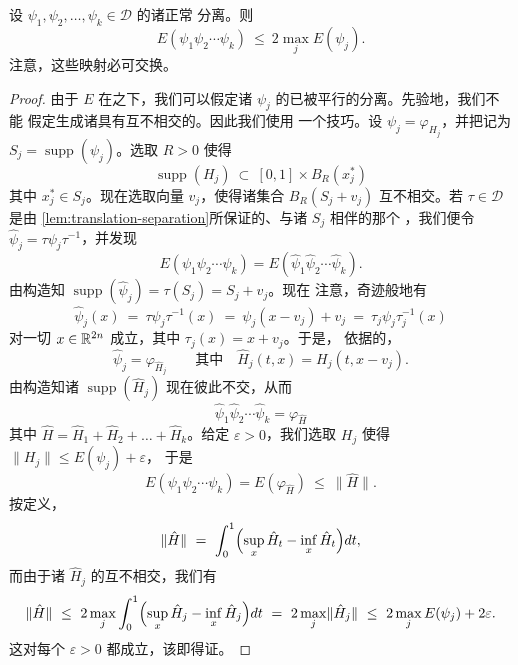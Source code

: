 \begin{lemma}\label{lem:energy-separated-product}
设 $\psi_{1},\psi_{2},\dots,\psi_{k}\in\mathcal{D}$ 的诸\trSupport{}正常%
分离。则
\[
E(\psi_{1}\psi_{2}\cdots\psi_{k})\ \leq\ 2\max_{j}E(\psi_{j}).
\]
注意，这些映射必可交换。
\end{lemma}

\begin{proof}
由于\trEnergy{} $E$ 在\trConjugate{}之下\trInvariant，我们可以假定诸%
$\psi_{j}$ 的\trSupport{}已被平行的\trHyperplane{}分离。先验地，我们不能%
假定生成诸\trHamiltonianFunction{}具有互不相交的\trSupport。因此我们使用%
一个技巧。设 $\psi_{j}=\varphi_{H_{j}}$，并把\trSupport{}记为%
$S_{j}=\operatorname{supp}(\psi_{j})$。选取 $R>0$ 使得
\[
\operatorname{supp}(H_{j})\ \subset\ [0,1]\times B_{R}(x_{j}^{*})
\]
其中 $x_{j}^{*}\in S_{j}$。现在选取向量 $v_{j}$，使得诸集合%
$B_{R}(S_{j}+v_{j})$ 互不相交。若 $\tau\in\mathcal{D}$ 是由%
\cref{lem:translation-separation}所保证的、与诸 $S_{j}$ 相伴的那个%
\trMapping，我们便令 $\hat{\psi}_{j}=\tau\psi_{j}\tau^{-1}$，并发现
\[
E(\psi_{1}\psi_{2}\cdots\psi_{k})=E(\hat{\psi}_{1}\hat{\psi}_{2}\cdots\hat{\psi}_{k}).
\]
由构造知 $\operatorname{supp}(\hat{\psi}_{j})=\tau(S_{j})=S_{j}+v_{j}$。现在%
注意，奇迹般地有
\[
\hat{\psi}_{j}(x)\ =\ \tau\psi_{j}\tau^{-1}(x)\ =\ \psi_{j}(x-v_{j})+v_{j}%
\ =\ \tau_{j}\psi_{j}\tau_{j}^{-1}(x)
\]
对一切 $x\in\mathbb{R}^{2n}$ 成立，其中\trTranslation{} $\tau_{j}(x)=x+v_{j}$。于是，%
依据\trHamiltonianVectorField{}的\trTransformationLaw，
\[
\hat{\psi}_{j}=\varphi_{\hat{H}_{j}}\qquad\text{其中}\quad \hat{H}_{j}(t,x)=H_{j}(t,x-v_{j}).
\]
由构造知诸 $\operatorname{supp}(\hat{H}_{j})$ 现在彼此不交，从而
\[
\hat{\psi}_{1}\hat{\psi}_{2}\cdots\hat{\psi}_{k}=\varphi_{\hat{H}}
\]
其中 $\hat{H}=\hat{H}_{1}+\hat{H}_{2}+\dots+\hat{H}_{k}$。给定%
$\varepsilon>0$，我们选取 $H_{j}$ 使得 $\lVert H_{j}\rVert\leq E(\psi_{j})+\varepsilon$，%
于是
\[
E(\psi_{1}\psi_{2}\cdots\psi_{k})=E(\varphi_{\hat{H}})\ \leq\ \lVert\hat{H}\rVert.
\]
按定义，
\[
\lVert\hat{H}\rVert\ =\ \int_{0}^{1}\Bigl(\sup_{x}\hat{H}_{t}-\inf_{x}\hat{H}_{t}\Bigr)dt,
\]
而由于诸 $\hat{H}_{j}$ 的\trSupport{}互不相交，我们有
\[
\lVert\hat{H}\rVert\ \leq\ 2\max_{j}\int_{0}^{1}\Bigl(\sup_{x}\hat{H}_{j}-\inf_{x}\hat{H}_{j}\Bigr)dt\ =\ 2\max_{j}\lVert\hat{H}_{j}\rVert\ \leq\ 2\max_{j}E(\psi_{j})+2\varepsilon.
\]
这对每个 $\varepsilon>0$ 都成立，该\trhLemma{}即得证。
\end{proof}

